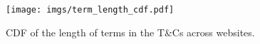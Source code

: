 \begin{figure}[!t] 
 \centering
 \texttt{[image: imgs/term\_length\_cdf.pdf]}
 \caption{CDF of the length of terms in the T\&Cs across \websitecnt websites.}
\label{fig:term_length_cdf}
\end{figure}